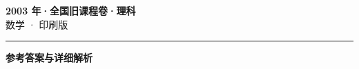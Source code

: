 \documentclass[zihao=5, a4paper]{ctexart}
\begin{document}
\begin{center}
  {\Large\bfseries 2003 年·全国旧课程卷·理科}\\[4pt]
  {\large 数学 · 印刷版}
\end{center}
\medskip
{}

\par\bigskip\hrule\bigskip
{}
\begin{center}{\large\bfseries 参考答案与详细解析}\end{center}
\smallskip

\end{document}
